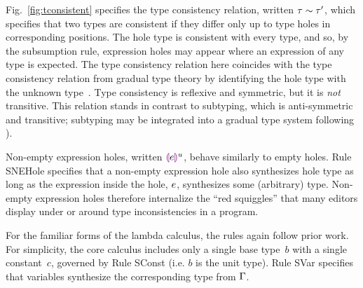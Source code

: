 Fig.~\ref{fig:tconsistent} specifies the type consistency relation, written $\tau \sim \tau'$, which specifies that two types are consistent if they differ only up to type holes in corresponding positions.
%
The hole type is consistent with every type, and so, by the subsumption rule, expression holes may appear where an expression of any type is expected. The type consistency relation here coincides with the type consistency relation from gradual type theory by identifying the hole type with the unknown type~\cite{Siek06a}.
%
Type consistency is reflexive and symmetric, but it is \emph{not} transitive.
%
This relation stands in contrast to subtyping, which is anti-symmetric and transitive; subtyping may be integrated into a gradual type system following \citet{Siek:2007qy}).

Non-empty expression holes, written $\textcolor{violet}{\llparenthesis}e\textcolor{violet}{\rrparenthesis}^{u}$, behave similarly to empty holes.
%
Rule {SNEHole} specifies that a non-empty expression hole also synthesizes hole type as long as the expression inside the hole, $e$, synthesizes some (arbitrary) type.
%
Non-empty expression holes therefore internalize the ``red squiggles'' that many editors display under or around type inconsistencies in a program.

For the familiar forms of the lambda calculus, the rules again follow prior work.
%
For simplicity, the core calculus includes only a single base type~$b$ with a single constant~$c$, governed by Rule {SConst} (i.e. $b$ is the unit type).
%
%
Rule {SVar} specifies that variables synthesize the corresponding type from $\Gamma$. 

